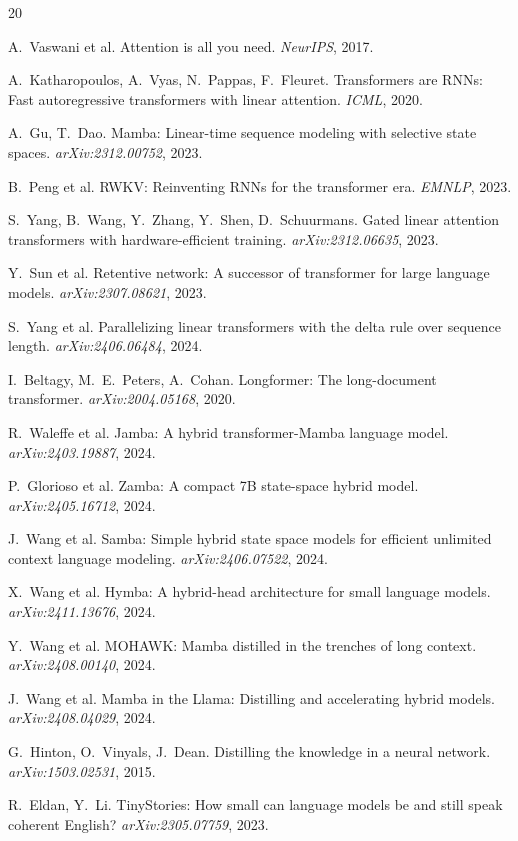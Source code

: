 \documentclass[11pt]{article}
\begin{document}

\begin{thebibliography}{20}

 A.~Vaswani et al.
\newblock Attention is all you need.
\newblock \emph{NeurIPS}, 2017.

 A.~Katharopoulos, A.~Vyas, N.~Pappas, F.~Fleuret.
\newblock Transformers are RNNs: Fast autoregressive transformers with linear attention.
\newblock \emph{ICML}, 2020.

 A.~Gu, T.~Dao.
\newblock Mamba: Linear-time sequence modeling with selective state spaces.
\newblock \emph{arXiv:2312.00752}, 2023.

 B.~Peng et al.
\newblock RWKV: Reinventing RNNs for the transformer era.
\newblock \emph{EMNLP}, 2023.

 S.~Yang, B.~Wang, Y.~Zhang, Y.~Shen, D.~Schuurmans.
\newblock Gated linear attention transformers with hardware-efficient training.
\newblock \emph{arXiv:2312.06635}, 2023.

 Y.~Sun et al.
\newblock Retentive network: A successor of transformer for large language models.
\newblock \emph{arXiv:2307.08621}, 2023.

 S.~Yang et al.
\newblock Parallelizing linear transformers with the delta rule over sequence length.
\newblock \emph{arXiv:2406.06484}, 2024.

 I.~Beltagy, M.~E.~Peters, A.~Cohan.
\newblock Longformer: The long-document transformer.
\newblock \emph{arXiv:2004.05168}, 2020.

 R.~Waleffe et al.
\newblock Jamba: A hybrid transformer-Mamba language model.
\newblock \emph{arXiv:2403.19887}, 2024.

 P.~Glorioso et al.
\newblock Zamba: A compact 7B state-space hybrid model.
\newblock \emph{arXiv:2405.16712}, 2024.

 J.~Wang et al.
\newblock Samba: Simple hybrid state space models for efficient unlimited context language modeling.
\newblock \emph{arXiv:2406.07522}, 2024.

 X.~Wang et al.
\newblock Hymba: A hybrid-head architecture for small language models.
\newblock \emph{arXiv:2411.13676}, 2024.

 Y.~Wang et al.
\newblock MOHAWK: Mamba distilled in the trenches of long context.
\newblock \emph{arXiv:2408.00140}, 2024.

 J.~Wang et al.
\newblock Mamba in the Llama: Distilling and accelerating hybrid models.
\newblock \emph{arXiv:2408.04029}, 2024.

 G.~Hinton, O.~Vinyals, J.~Dean.
\newblock Distilling the knowledge in a neural network.
\newblock \emph{arXiv:1503.02531}, 2015.

 R.~Eldan, Y.~Li.
\newblock TinyStories: How small can language models be and still speak coherent English?
\newblock \emph{arXiv:2305.07759}, 2023.

\end{thebibliography}
\end{document}
